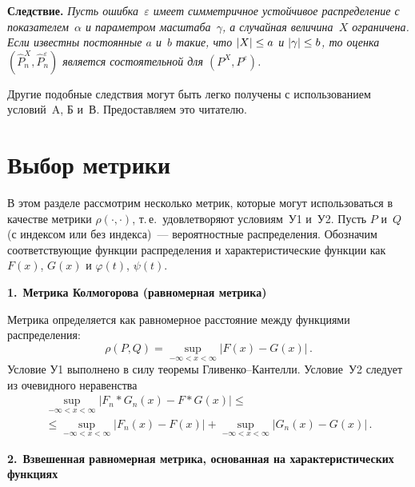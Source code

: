 \begin{multicols}{2}
\medskip

\noindent
\textbf{Следствие.} \textit{Пусть ошибка~$\varepsilon$ имеет симметричное
устойчивое распределение с показателем~$\alpha$ и па\-ра\-мет\-ром масштаба~$\gamma$, 
а случайная величина~$X$ ограничена. Если известны
постоянные $a$ и~$b$ такие, что $|X|\hm\le a$ и $|\gamma|\hm\le b$,
то оценка $(\hat P_n^X,\hat P_n^\varepsilon)$ является состоятельной
для $(P^X,P^\varepsilon)$.}


Другие подобные следствия могут быть легко получены с использованием
условий~A, Б и~В. Предо\-став\-ля\-ем это читателю.

\section{Выбор метрики}

В этом разделе рассмотрим несколько метрик, которые могут
использоваться в качестве метрики $\rho(\cdot,\cdot)$, т.\,е.\
удовлетворяют условиям~У1 и~У2. Пусть $P$ и~$Q$ (с индексом или без
индекса)~--- вероятностные распределения. Обозначим соответ\-ст\-ву\-ющие
функции распределения и характеристические функции как $F(x)$,
$G(x)$ и $\varphi(t)$, $\psi(t)$.

\smallskip
\textbf{1.}\ \textbf{Метрика Колмогорова (равномерная метрика)}

Метрика определяется как равномерное расстояние между функциями
распределения:
$$
\rho(P,Q)=\sup_{-\infty<x<\infty}|F(x)-G(x)|\,.
$$
Условие У1 выполнено в силу теоремы Гли\-вен\-ко--Кан\-тел\-ли. Условие~У2
следует из очевидного неравенства
\begin{multline*}
\sup\limits_{-\infty<x<\infty}|F_n\ast G_n(x)-F\ast G(x)|\le{}\\
{}\le\!\!\!
\sup\limits_{-\infty<x<\infty}|F_n(x)-F(x)|+\!\!\!\sup\limits_{-\infty<x<\infty}|G_n(x)-G(x)|\,.
\end{multline*}

\smallskip
\textbf{2.}\ \textbf{Взвешенная равномерная метрика, основанная на характеристических
функциях}


\end{multicols}
